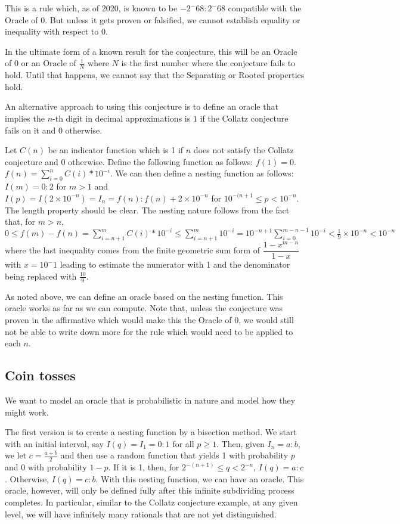 \documentclass[12pt]{article}
\theoremstyle{remark}
\begin{document}
This is a rule which, as of 2020, is known to be $-2^-68:2^-68$ compatible with the Oracle of 0. But unless it gets proven or falsified, we cannot establish equality or inequality with respect to 0. 

In the ultimate form of a known result for the conjecture, this will be an Oracle of 0 or an Oracle of $\tfrac{1}{N}$ where $N$ is the first number where the conjecture fails to hold. Until that happens, we cannot say that the Separating or Rooted properties hold. 

An alternative approach to using this conjecture is to define an oracle that implies the $n$-th digit in decimal approximations is $1$ if the Collatz conjecture fails on it and $0$ otherwise.

Let $C(n)$ be an indicator function which is 1 if $n$ does not satisfy the Collatz conjecture and 0 otherwise. Define the following function as follows: $f(1) = 0$. $f(n) = \sum_{i=0}^n C(i)*10^{-i} $.  We can then define a nesting function as follows: $I(m)=0:2$ for $m > 1$ and $I(p) = I(2 \times 10^{-n}) = I_n = f(n): f(n)+2 \times 10^{-n}$ for $10^{-(n+1} \leq p < 10^{-n}$. The length property should be clear. The nesting nature follows from the fact that, for $m > n$,  $0 \leq  f(m)-f(n) = \sum_{i=n+1}^m C(i)*10^{-i} \leq \sum_{i=n+1}^m 10^{-i} = 10^{-n+1}\sum_{i=0}^{m-n-1} 10^{-i} < \tfrac{1}{9} \times 10^{-n} < 10^{-n} $ where the last inequality comes from the finite geometric sum form of $\dfrac{1-x^{m-n}}{1-x}$ with $x=10^-1$ leading to estimate the numerator with 1 and the denominator being replaced with $\tfrac{10}{9}$. 

As noted above, we can define an oracle based on the nesting function. This oracle works as far as we can compute. Note that, unless the conjecture was proven in the affirmative which would make this the Oracle of 0, we would still not be able to write down more for the rule which would need to be applied to each $n$. 


\subsection{Coin tosses}

We want to model an oracle that is probabilistic in nature and model how they might work. 

The first version is to create a nesting function by a bisection method. We start with an initial interval, say $I(q) = I_1 = 0:1$ for all $p\geq 1$. Then, given $I_n = a:b$, we let $c = \tfrac{a+b}{2}$ and then use a random function that yields 1 with probability $p$ and 0 with probability $1-p$. If it is 1, then, for $2^{-(n+1)} \leq q  < 2^{-n}$, $I(q) = a:c$. Otherwise, $I(q) = c:b$. With this nesting function, we can have an oracle. This oracle, however, will only be defined fully after this infinite subdividing process completes. In particular, similar to the Collatz conjecture example, at any given level, we will have infinitely many rationals that are not yet distinguished.  
\end{document}
